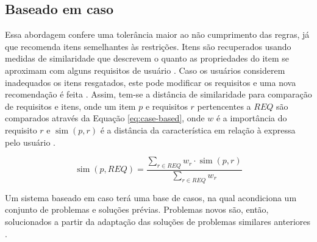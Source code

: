     
    
\subsection{Baseado em caso}
    Essa abordagem confere uma tolerância maior ao não cumprimento das regras, já que recomenda itens semelhantes às restrições. Itens são recuperados usando medidas de similaridade que descrevem o quanto as propriedades do item se aproximam com alguns requisitos de usuário \cite{Aggarwal2016}. Caso os usuários considerem inadequados os itens resgatados, este pode modificar os requisitos e uma nova recomendação é feita \cite{Lorenzi2005}.
    Assim, tem-se a distância de similaridade para comparação de requisitos e itens, onde um item $p$ e requisitos $r$ pertencentes a $REQ$ são comparados através da Equação \ref{eq:case-based}, onde $w$ é a importância do requisito $r$ e $\operatorname{sim}(p, r)$ é a distância da característica em relação à expressa pelo usuário \cite{Jannach2010}. 
    
    \begin{equation}
        \operatorname{sim}(p, REQ) = \frac{\sum_{r \in REQ}w_r \cdot \operatorname{sim}(p,r)}{\sum_{r \in REQ}w_r} \label{eq:case-based}
    \end{equation}
    
    Um sistema baseado em caso terá uma base de casos, na qual acondiciona um conjunto de problemas e soluções prévias. Problemas novos são, então, solucionados a partir da adaptação das soluções de problemas similares anteriores \cite{Bridge2005}. 
            
